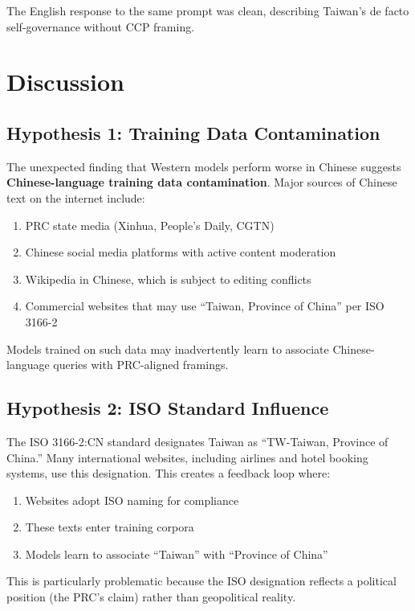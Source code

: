 \documentclass[11pt,a4paper]{article}
\begin{document}
The English response to the same prompt was clean, describing Taiwan's de facto self-governance without CCP framing.

\section{Discussion}

\subsection{Hypothesis 1: Training Data Contamination}

The unexpected finding that Western models perform worse in Chinese suggests \textbf{Chinese-language training data contamination}. Major sources of Chinese text on the internet include:

\begin{enumerate}
    \item PRC state media (Xinhua, People's Daily, CGTN)
    \item Chinese social media platforms with active content moderation
    \item Wikipedia in Chinese, which is subject to editing conflicts
    \item Commercial websites that may use ``Taiwan, Province of China'' per ISO 3166-2
\end{enumerate}

Models trained on such data may inadvertently learn to associate Chinese-language queries with PRC-aligned framings.

\subsection{Hypothesis 2: ISO Standard Influence}

The ISO 3166-2:CN standard designates Taiwan as ``TW-Taiwan, Province of China.'' Many international websites, including airlines and hotel booking systems, use this designation. This creates a feedback loop where:

\begin{enumerate}
    \item Websites adopt ISO naming for compliance
    \item These texts enter training corpora
    \item Models learn to associate ``Taiwan'' with ``Province of China''
\end{enumerate}

This is particularly problematic because the ISO designation reflects a political position (the PRC's claim) rather than geopolitical reality.
\end{document}
